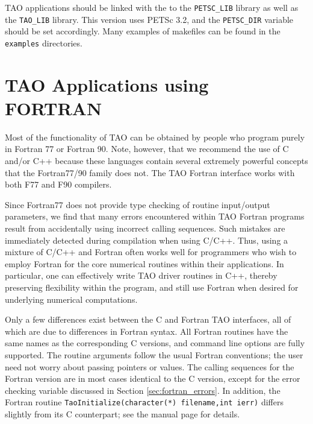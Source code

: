 TAO applications should be linked with the
to the {\tt PETSC\_LIB} library
as well as the {\tt TAO\_LIB} library. This version uses
PETSc 3.2, and the {\tt PETSC\_DIR} variable
should be set accordingly.  Many examples of makefiles
can be found in the {\tt examples} directories.


\section{TAO Applications using FORTRAN}
\label{chapter:fortran}
Most of the functionality of TAO can be obtained by people who program
purely in Fortran 77 or Fortran 90.  Note, however, that we recommend
the use of C and/or C++ because these languages contain several
extremely powerful concepts that the Fortran77/90 family does not.
The TAO Fortran interface works with both F77 and F90 compilers.

Since Fortran77 does not provide type checking of routine input/output
parameters, we find that many errors encountered within TAO Fortran
programs result from accidentally using incorrect calling sequences.
Such mistakes are immediately detected during compilation when using
C/C++.  Thus, using a mixture of C/C++ and Fortran often works well
for programmers who wish to employ Fortran for the core numerical
routines within their applications.  In particular, one can
effectively write TAO driver routines in C++, thereby preserving
flexibility within the program, and still use Fortran when desired for
underlying numerical computations.


Only a few differences exist between the C and Fortran TAO interfaces,
all of which are due to differences in Fortran syntax.  All Fortran
routines have the same names as the corresponding C versions, and
command line options are fully supported. The routine arguments follow
the usual Fortran conventions; the user need not worry about passing
pointers or values.  The calling sequences for the Fortran version are
in most cases identical to the C version, except for the error
checking variable discussed in Section \ref{sec:fortran_errors}.  In
addition, the Fortran routine {\tt TaoInitialize(character(*) filename,int ierr)}
differs slightly from its C counterpart; see the manual page for
details.


